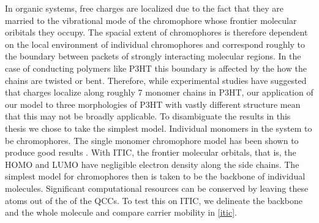 In organic systems, free charges are localized due to the fact that they are married to the vibrational mode of the
chromophore whose frontier molecular oribitals they occupy. 
The spacial extent of chromophores is therefore dependent on the local environment of individual chromophores
and correspond roughly to the boundary between packets of strongly interacting molecular regions. 
In the case of conducting polymers like P3HT this boundary is affected by the how the chains are twisted
or bent. Therefore, while experimental studies have suggested that charges localize along roughly 7 monomer chains
in P3HT, our application of our model to three morphologies of P3HT with vastly different structure mean 
that this may not be broadly applicable. To disambiguate the results in this thesis we chose to take the
simplest model. Individual monomers in the system to be chromophores. The single monomer chromophore model has been shown to
produce good results \cite{jones2017}.
With ITIC, the frontier molecular orbitals, that is, the HOMO
and LUMO have negligible electron density along the side chains. The simplest model for chromophores then is
taken to be the backbone of individual molecules. Significant computational resources 
can be conserved by leaving these atoms out of the of the QCCs. 
To test this on ITIC, we delineate the backbone and the whole molecule and compare carrier mobility in \autoref{itic}.

